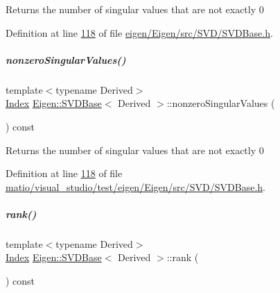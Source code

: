 \begin{DoxyReturn}{Returns}
the number of singular values that are not exactly 0 
\end{DoxyReturn}


Definition at line \hyperlink{eigen_2_eigen_2src_2_s_v_d_2_s_v_d_base_8h_source_l00118}{118} of file \hyperlink{eigen_2_eigen_2src_2_s_v_d_2_s_v_d_base_8h_source}{eigen/\+Eigen/src/\+S\+V\+D/\+S\+V\+D\+Base.\+h}.

\mbox{\label{group___s_v_d___module_afe8a555f38393a319a71ec0f0331c9ef}} 
\subparagraph{\texorpdfstring{nonzero\+Singular\+Values()}{nonzeroSingularValues()}\hspace{0.1cm}{\footnotesize\ttfamily [2/2]}}
{\footnotesize\ttfamily template$<$typename Derived$>$ \\
\hyperlink{group___s_v_d___module_a6229a37997eca1072b52cca5ee7a2bec}{Index} \hyperlink{group___s_v_d___module_class_eigen_1_1_s_v_d_base}{Eigen\+::\+S\+V\+D\+Base}$<$ Derived $>$\+::nonzero\+Singular\+Values (\begin{DoxyParamCaption}{ }\end{DoxyParamCaption}) const\hspace{0.3cm}{\ttfamily [inline]}}

\begin{DoxyReturn}{Returns}
the number of singular values that are not exactly 0 
\end{DoxyReturn}


Definition at line \hyperlink{matio_2visual__studio_2test_2eigen_2_eigen_2src_2_s_v_d_2_s_v_d_base_8h_source_l00118}{118} of file \hyperlink{matio_2visual__studio_2test_2eigen_2_eigen_2src_2_s_v_d_2_s_v_d_base_8h_source}{matio/visual\+\_\+studio/test/eigen/\+Eigen/src/\+S\+V\+D/\+S\+V\+D\+Base.\+h}.

\mbox{\label{group___s_v_d___module_a30b89e24f42f1692079eea31b361d26a}} 
\subparagraph{\texorpdfstring{rank()}{rank()}\hspace{0.1cm}{\footnotesize\ttfamily [1/2]}}
{\footnotesize\ttfamily template$<$typename Derived$>$ \\
\hyperlink{group___s_v_d___module_a6229a37997eca1072b52cca5ee7a2bec}{Index} \hyperlink{group___s_v_d___module_class_eigen_1_1_s_v_d_base}{Eigen\+::\+S\+V\+D\+Base}$<$ Derived $>$\+::rank (\begin{DoxyParamCaption}{ }\end{DoxyParamCaption}) const\hspace{0.3cm}{\ttfamily [inline]}}

